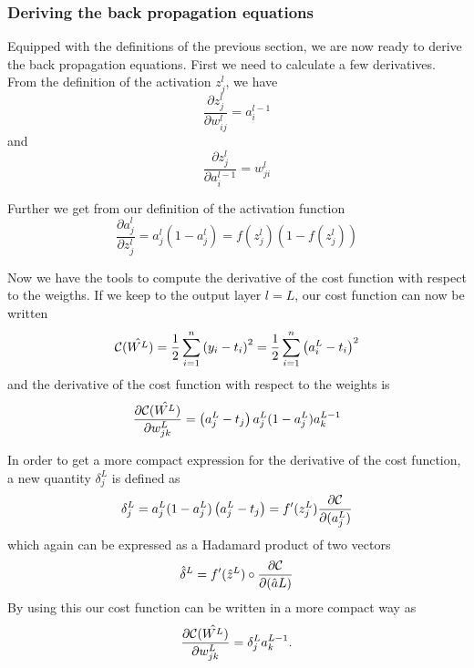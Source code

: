 \documentclass[a4paper,12pt]{article}
\begin{document}
\subsubsection{Deriving the back propagation equations}
Equipped with the definitions of the previous section, we are now ready to derive the back propagation equations. First we need to calculate a few derivatives.\newline
From the definition of the activation $z_j^l$, we have
\begin{equation}
    \frac{\partial z_j^l}{\partial w_{ij}^l} = a_i^{l-1}
\end{equation}
and
\begin{equation}
    \frac{\partial z_j^l}{\partial a_i^{l-1}} = w_{ji}^l
\end{equation}

Further we get from our definition of the activation function
\begin{equation}
    \frac{\partial a_j^l}{\partial z_j^{l}} = a_j^l(1-a_j^l)=f(z_j^l)(1-f(z_j^l))
\end{equation}

Now we have the tools to compute the derivative of the cost function with respect to the weigths. If we keep to the output layer $l=L$, our cost function can now be written
\begin{equation}
    {\cal C}(\hat{W^L})  =  \frac{1}{2}\sum_{i=1}^n\left(y_i - t_i\right)^2=\frac{1}{2}\sum_{i=1}^n\left(a_i^L - t_i\right)^2
\end{equation}
and the derivative of the cost function with respect to the weights is
\begin{equation}
    \frac{\partial{\cal C}(\hat{W^L})}{\partial w_{jk}^L}  =  \left(a_j^L - t_j\right)a_j^L(1-a_j^L)a_k^{L-1}
\end{equation}

In order to get a more compact expression for the derivative of the cost function, a new quantity $\delta_j^L$ is defined as
\begin{equation}
    \delta_j^L = a_j^L(1-a_j^L)\left(a_j^L - t_j\right) = f'(z_j^L)\frac{\partial {\cal C}}{\partial (a_j^L)}
\end{equation}
which again can be expressed as a Hadamard product of two vectors
\begin{equation}
    \hat{\delta}^L = f'(\hat{z}^L)\circ\frac{\partial {\cal C}}{\partial (\hat{a}L)}
\end{equation}
By using this our cost function can be written in a more compact way as
\begin{equation}
    \frac{\partial{\cal C}(\hat{W^L})}{\partial w_{jk}^L}  =  \delta_j^La_k^{L-1}.
\end{equation}
\end{document}
